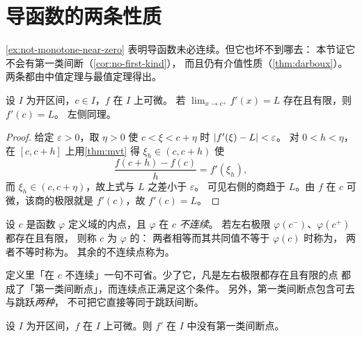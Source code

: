 \section{导函数的两条性质}
\label{sec:derivative-properties}

\cref{ex:not-monotone-near-zero} 表明导函数未必连续。但它也坏不到哪去：
本节证它不会有第一类间断（\cref{cor:no-first-kind}），
而且仍有介值性质（\cref{thm:darboux}）。两条都由中值定理与最值定理得出。

\begin{lemma}[单侧极限若存在必等于导数]
  \label{lem:one-sided-limit}
  设 \(I\) 为开区间，\(c \in I\)，\(f\) 在 \(I\) 上可微。
  若 \(\lim_{x \to c^{+}} f'(x) = L\) 存在且有限，则 \(f'(c) = L\)。
  左侧同理。
\end{lemma}

\begin{proof}
  给定 \(\varepsilon>0\)，取 \(\eta>0\) 使 \(c<\xi<c+\eta\) 时 \(\lvert f'(\xi)-L\rvert<\varepsilon\)。
  对 \(0<h<\eta\)，在 \([c,c+h]\) 上用\cref{thm:mvt} 得 \(\xi_{h} \in (c,c+h)\) 使
  \[
    \frac{f(c+h)-f(c)}{h} = f'(\xi_{h}) ,
  \]
  而 \(\xi_{h} \in (c,c+\eta)\)，故上式与 \(L\) 之差小于 \(\varepsilon\)。
  可见右侧的商趋于 \(L\)。由 \(f\) 在 \(c\) 可微，该商的极限就是 \(f'(c)\)，故 \(f'(c)=L\)。
\end{proof}

\begin{definition}[第一类间断点]
  \label{def:first-kind}
  设 \(c\) 是函数 \(\varphi\) 定义域的内点，且 \(\varphi\) 在 \(c\) \emph{不连续}。
  若左右极限 \(\varphi(c^{-})\)、\(\varphi(c^{+})\) 都存在且有限，
  则称 \(c\) 为 \(\varphi\) 的：
  两者相等而其共同值不等于 \(\varphi(c)\) 时称为，
  两者不等时称为。
  其余的不连续点称为。
\end{definition}

\begin{pitfall}
  定义里「在 \(c\) 不连续」一句不可省。少了它，凡是左右极限都存在且有限的点
  都成了「第一类间断点」，而连续点正满足这个条件。
  另外，第一类间断点包含可去与跳跃\emph{两种}，
  不可把它直接等同于跳跃间断。
\end{pitfall}

\begin{corollary}[导函数没有第一类间断点]
  \label{cor:no-first-kind}
  设 \(I\) 为开区间，\(f\) 在 \(I\) 上可微。则 \(f'\) 在 \(I\) 中没有第一类间断点。
\end{corollary}

